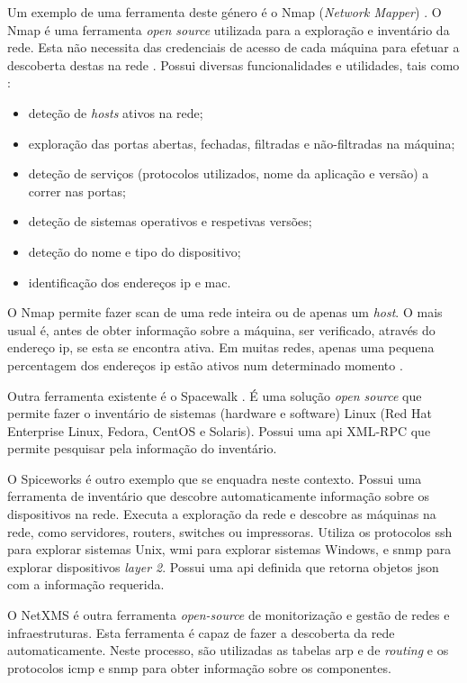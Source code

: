 \documentclass[
  oneside,
  11pt, a4paper,
  footinclude=true,
  headinclude=true,
  cleardoublepage=empty
]{scrbook}
\begin{document}
Um exemplo de uma ferramenta deste género é o Nmap (\textit{Network Mapper}) \cite{nmap}. O Nmap é uma ferramenta \textit{open source} utilizada para a exploração e inventário da rede. Esta não necessita das credenciais de acesso de cada máquina para efetuar a descoberta destas na rede \cite{owen2019operation}. Possui diversas funcionalidades e utilidades, tais como \cite{hwang2019effective}:

\begin{itemize}
    \item deteção de \textit{hosts} ativos na rede;
    \item exploração das portas abertas, fechadas, filtradas e não-filtradas na máquina;
    \item deteção de serviços (protocolos utilizados, nome da aplicação e versão) a correr nas portas;
    \item deteção de sistemas operativos e respetivas versões;
    \item deteção do nome e tipo do dispositivo;
    \item identificação dos endereços \gls{ip} e \gls{mac}.
\end{itemize}

O Nmap permite fazer scan de uma rede inteira ou de apenas um \textit{host}. O mais usual é, antes de obter informação sobre a máquina, ser verificado, através do endereço \gls{ip}, se esta se encontra ativa. Em muitas redes, apenas uma pequena percentagem dos endereços \gls{ip} estão ativos num determinado momento \cite{nmap}. 

Outra ferramenta existente é o Spacewalk \cite{spacewalk}. É uma solução \textit{open source} que permite fazer o inventário de sistemas (hardware e software) Linux (Red Hat Enterprise Linux, Fedora, CentOS e Solaris). Possui uma \gls{api} XML-RPC \cite{spacewalkapi} que permite pesquisar pela informação do inventário.

O Spiceworks \cite{spiceworks} é outro exemplo que se enquadra neste contexto. Possui uma ferramenta de inventário que descobre automaticamente informação sobre os dispositivos na rede. Executa a exploração da rede e descobre as máquinas na rede, como servidores, routers, switches ou impressoras. Utiliza os protocolos \gls{ssh} para explorar sistemas Unix, \gls{wmi} para explorar sistemas Windows, e \gls{snmp} para explorar dispositivos \textit{layer 2}. Possui uma \gls{api} definida \cite{spiceworksapi} que retorna objetos \gls{json} com a informação requerida.

O NetXMS \cite{netxms} é outra ferramenta \textit{open-source} de monitorização e gestão de redes e infraestruturas. Esta ferramenta é capaz de fazer a descoberta da rede automaticamente. Neste processo, são utilizadas as tabelas \gls{arp} e de \textit{routing} e os protocolos \gls{icmp} e \gls{snmp} para obter informação sobre os componentes.
\end{document}
